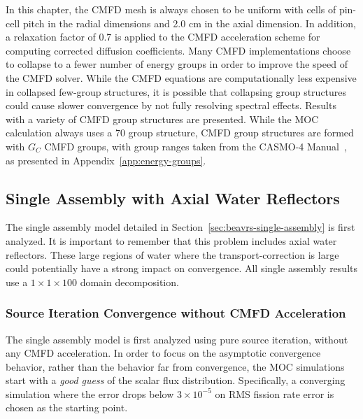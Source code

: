 In this chapter, the \ac{CMFD} mesh is always chosen to be uniform with cells of pin-cell pitch in the radial dimensions and 2.0 cm in the axial dimension. In addition, a relaxation factor of 0.7 is applied to the \ac{CMFD} acceleration scheme for computing corrected diffusion coefficients. Many \ac{CMFD} implementations choose to collapse to a fewer number of energy groups in order to improve the speed of the \ac{CMFD} solver. While the \ac{CMFD} equations are computationally less expensive in collapsed few-group structures, it is possible that collapsing group structures could cause slower convergence by not fully resolving spectral effects. Results with a variety of \ac{CMFD} group structures are presented. While the \ac{MOC} calculation always uses a 70 group structure, \ac{CMFD} group structures are formed with $G_C$ \ac{CMFD} groups, with group ranges taken from the CASMO-4 Manual~\cite{edenius1995casmo}, as presented in Appendix~\ref{app:energy-groups}.

\subsection{Single Assembly with Axial Water Reflectors}
\label{sec:sa-axial-ref}

The single assembly model detailed in Section~\ref{sec:beavrs-single-assembly} is first analyzed. It is important to remember that this problem includes axial water reflectors. These large regions of water where the transport-correction is large could potentially have a strong impact on convergence. All single assembly results use a $1\times 1 \times 100$ domain decomposition.

\subsubsection{Source Iteration Convergence without CMFD Acceleration}

The single assembly model is first analyzed using pure source iteration, without any \ac{CMFD} acceleration. In order to focus on the asymptotic convergence behavior, rather than the behavior far from convergence, the \ac{MOC} simulations start with a \textit{good guess} of the scalar flux distribution. Specifically, a converging simulation where the error drops below $3\times 10^{-5}$ on \ac{RMS} fission rate error is chosen as the starting point.

